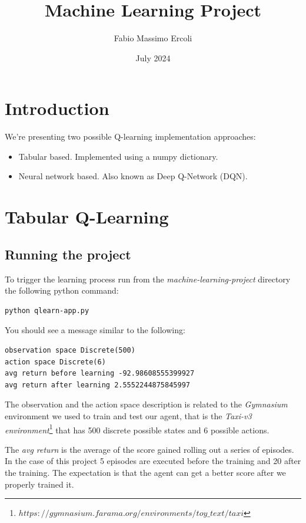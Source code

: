 \documentclass{article}
\title{\textbf{Machine Learning Project}}
\author{Fabio Massimo Ercoli}
\date{July 2024}
\begin{document}
\maketitle

\section{Introduction}

We're presenting two possible Q-learning implementation approaches:
\begin{itemize}
  \item Tabular based. Implemented using a numpy dictionary.
  \item Neural network based. Also known as Deep Q-Network (DQN).
\end{itemize}

\section{Tabular Q-Learning}

\subsection{Running the project}

To trigger the learning process run from the \emph{machine-learning-project} directory the following python command:

\begin{verbatim}
python qlearn-app.py
\end{verbatim}

You should see a message similar to the following:

\begin{verbatim}
observation space Discrete(500)
action space Discrete(6)
avg return before learning -92.98608555399927
avg return after learning 2.5552244875845997
\end{verbatim}

The observation and the action space description is related to the \emph{Gymnasium} environment 
we used to train and test our agent, that is the 
\emph{Taxi-v3 environment}\footnote[1]{$https://gymnasium.farama.org/environments/toy\_text/taxi$} 
that has 500 discrete possible states and 6 possible actions.

The \emph{avg return} is the average of the score gained rolling out a series of episodes.
In the case of this project 5 episodes are executed before the training and 20 after the training.
The expectation is that the agent can get a better score after we properly trained it.
\end{document}
